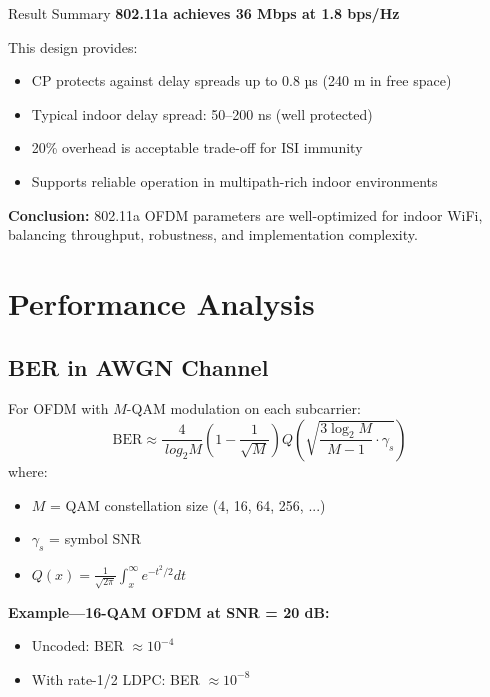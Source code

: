 \begin{calloutbox}[colback=black!8!white,colframe=black]{Result Summary}
\textbf{802.11a achieves 36 Mbps at 1.8 bps/Hz}

This design provides:
\begin{itemize}
\item CP protects against delay spreads up to 0.8 µs (240 m in free space)
\item Typical indoor delay spread: 50--200 ns (well protected)
\item 20\% overhead is acceptable trade-off for ISI immunity
\item Supports reliable operation in multipath-rich indoor environments
\end{itemize}

\textbf{Conclusion:} 802.11a OFDM parameters are well-optimized for indoor WiFi, balancing throughput, robustness, and implementation complexity.
\end{calloutbox}

\section{Performance Analysis}

\subsection{BER in AWGN Channel}

For OFDM with $M$-QAM modulation on each subcarrier:
\begin{equation}
\mathrm{BER} \approx \frac{4}{\ log_2 M} \left(1 - \frac{1}{\sqrt{M}}\right) Q\left(\sqrt{\frac{3 \log_2 M}{M-1} \cdot \gamma_s}\right)
\end{equation}
where:
\begin{itemize}
\item $M$ = QAM constellation size (4, 16, 64, 256, ...)
\item $\gamma_s$ = symbol SNR
\item $Q(x) = \frac{1}{\sqrt{2\pi}}\int_x^\infty e^{-t^2/2} dt$
\end{itemize}

\textbf{Example---16-QAM OFDM at SNR = 20 dB:}
\begin{itemize}
\item Uncoded: BER $\approx 10^{-4}$
\item With rate-1/2 LDPC: BER $\approx 10^{-8}$
\end{itemize}

